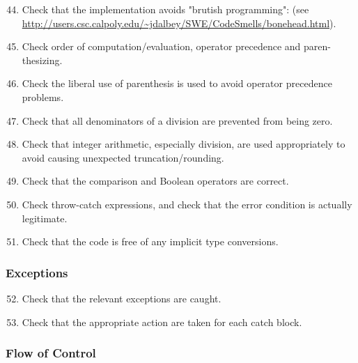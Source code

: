 \begin{enumerate}
\setcounter{enumi}{43}

\item  Check that the implementation avoids "brutish programming": (see \url{http://users.csc.calpoly.edu/~jdalbey/SWE/CodeSmells/bonehead.html}).

\item Check order of computation/evaluation, operator precedence and paren- thesizing.

\item Check the liberal use of parenthesis is used to avoid operator precedence problems.

\item Check that all denominators of a division are prevented from being zero.

\item Check that integer arithmetic, especially division, are used appropriately to avoid causing unexpected truncation/rounding.

\item Check that the comparison and Boolean operators are correct.

\item  Check throw-catch expressions, and check that the error condition is actually legitimate.

\item Check that the code is free of any implicit type conversions.

\end{enumerate}

\subsubsection{Exceptions} \label{sssec:exce}

\begin{enumerate}
\setcounter{enumi}{51}

\item Check that the relevant exceptions are caught.

\item  Check that the appropriate action are taken for each catch block.

\end{enumerate}

\subsubsection{Flow of Control} \label{sssec:flow}

